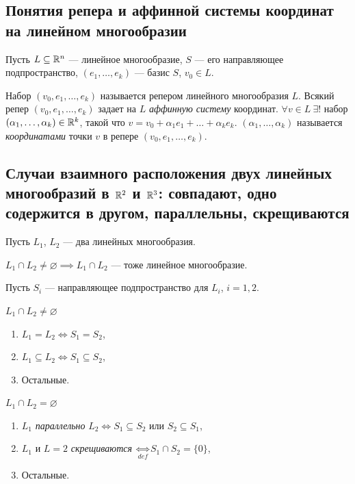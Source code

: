 \subsection{Понятия репера и аффинной системы координат на линейном многообразии}

Пусть $L \subseteq \mathbb{R}^n$ --- линейное многообразие, $S$ --- его направляющее подпространство, $(e_1, \dots, e_k)$ --- базис $S$, $v_0 \in L$.

\begin{definition}
    Набор $(v_0, e_1, \dots, e_k)$ называется репером линейного многообразия $L$.
    Всякий репер $(v_0, e_1, \dots, e_k)$ задает на $L$ \textit{аффинную систему} координат.
    $\forall v \in L \ \exists!$ набор $(\alpha_1, \dots, \alpha_k) \in \mathbb{R}^k$, такой что $v = v_0 + \alpha_1 e_1 + \dots + \alpha_k e_k$. $(\alpha_1, \dots, \alpha_k)$ называется \textit{координатами} точки $v$ в репере $(v_0, e_1, \dots, e_k)$.
\end{definition}


\subsection{Случаи взаимного расположения двух линейных многообразий в $\mathbb{R}^2$ и $\mathbb{R}^3$: совпадают, одно содержится в другом, параллельны, скрещиваются}

Пусть $L_1$, $L_2$ --- два линейных многообразия.

$L_1 \cap L_2 \neq \varnothing \implies L_1 \cap L_2$ --- тоже линейное многообразие.

Пусть $S_i$ --- направляющее подпространство для $L_i$, $i = 1, 2$.

\bigskip
\begin{minipage}{0.3\linewidth}
    \hspace{1cm} $L_1 \cap L_2 \neq \varnothing$
    \begin{enumerate}[nosep]
    \item $L_1 = L_2 \iff S_1 = S_2$,
    \item $L_1 \subseteq L_2 \iff S_1 \subseteq S_2$,
    \item Остальные.
    \end{enumerate}
\end{minipage}
\begin{minipage}{0.5\linewidth}
    \hspace{1cm} $L_1 \cap L_2 = \varnothing$
    \begin{enumerate}[nosep]
    \item $L_1$ \textit{параллельно} $L_2 \iff S_1 \subseteq S_2$ или $S_2 \subseteq S_1$,
    \item $L_1$ и $L=2$ \textit{скрещиваются} $\underset{def}{\iff} S_1 \cap S_2 = \{0\}$,
    \item Остальные.
    \end{enumerate}
\end{minipage}


